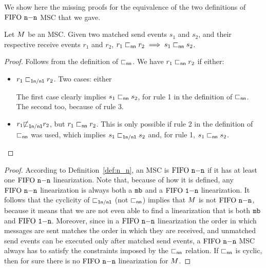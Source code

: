 We show here the missing proofs for the equivalence of the two definitions of $\text{FIFO } \mathtt{n\mathsf{-}n}$ MSC that we gave.

\begin{proposition}
	Let $M$ be an MSC. Given two matched send events $s_1$ and $s_2$, and their respective receive events $r_1$ and $r_2$, $r_1 \sqsubset_{\mathsf{nn}} r_2 \implies s_1 \sqsubset_{\mathsf{nn}} s_2$.
\end{proposition}
\begin{proof}
    Follows from the definition of $\sqsubset_{\mathsf{nn}}$. We have $r_1 \sqsubset_{\mathsf{nn}} r_2$ if either:
    \begin{itemize}%
        \item $r_1 \sqsubset_{\mathsf{1n/n1}} r_2$. Two cases: either 
        The first case clearly implies $s_1 \sqsubset_{\mathsf{nn}} s_2$, for rule 1 in the definition of $\sqsubset_{\mathsf{nn}}$. The second too, because of rule 3.
        \item  $r_1 {\not\sqsubset}_{\mathsf{1n/n1}} r_2$, but $r_1 \sqsubset_{\mathsf{nn}} r_2$. This is only possible if rule 2 in the definition of $\sqsubset_{\mathsf{nn}}$ was used, which implies $s_1 \sqsubset_{\mathsf{1n/n1}} s_2$ and, for rule 1, $s_1 \sqsubset_{\mathsf{nn}} s_2$.
    \end{itemize}
\end{proof}

\nnsecondprop*
\begin{proof}
    According to Definition~\ref{def:n_n}, an MSC is $\text{FIFO } \mathtt{n\mathsf{-}n}$ if it has at least one $\text{FIFO } \mathtt{n\mathsf{-}n}$ linearization. Note that, because of how it is defined, any $\text{FIFO } \mathtt{n\mathsf{-}n}$ linearization is always both a $\mathtt{mb}$ and a $\text{FIFO } \mathtt{1\mathsf{-}n}$ linearization. It follows that the cyclicity of $\sqsubset_{\mathsf{1n/n1}}$ (not $\sqsubset_{\mathsf{nn}}$) implies that $M$ is not $\text{FIFO } \mathtt{n\mathsf{-}n}$, because it means that we are not even able to find a linearization that is both $\mathtt{mb}$ and $\text{FIFO } \mathtt{1\mathsf{-}n}$. Moreover, since in a $\text{FIFO } \mathtt{n\mathsf{-}n}$ linearization the order in which messages are sent matches the order in which they are received, and unmatched send events can be executed only after matched send events, a $\text{FIFO } \mathtt{n\mathsf{-}n}$ MSC always has to satisfy the constraints imposed by the $\sqsubset_{\mathsf{nn}}$ relation. If $\sqsubset_{\mathsf{nn}}$ is cyclic, then for sure there is no $\text{FIFO } \mathtt{n\mathsf{-}n}$ linearization for $M$.
\end{proof}    

